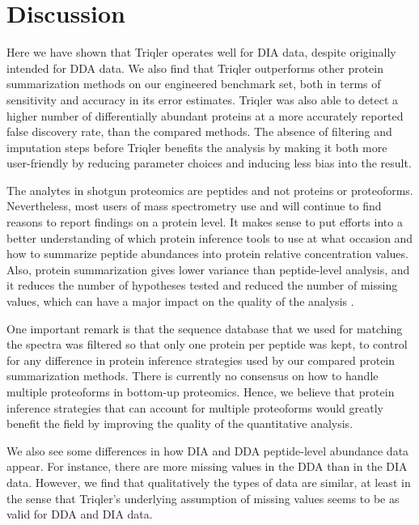 \documentclass[10pt,letterpaper]{article}
\begin{document}
\section*{Discussion}

Here we have shown that Triqler operates well for DIA data, despite originally intended for DDA data. We also find that Triqler outperforms other protein summarization methods on our engineered benchmark set, both in terms of sensitivity and accuracy in its error estimates. Triqler was also able to detect a higher number of differentially abundant proteins at a more accurately reported false discovery rate, than the compared methods. The absence of filtering and imputation steps before Triqler benefits the analysis by making it both more user-friendly by reducing parameter choices and inducing less bias into the result. 

The analytes in shotgun proteomics are peptides and not proteins or proteoforms. Nevertheless, most users of mass spectrometry use and will continue to find reasons to report findings on a protein level. It makes sense to put efforts into a better understanding of which protein inference tools to use at what occasion and how to summarize peptide abundances into protein relative concentration values.  Also, protein summarization gives lower variance than peptide-level analysis, and it reduces the number of hypotheses tested and reduced the number of missing values, which can have a major impact on the quality of the analysis \cite{plubell2021can}.   

One important remark is that the sequence database that we used for matching the spectra was filtered so that only one protein per peptide was kept, to control for any difference in protein inference strategies used by our compared protein summarization methods. There is currently no consensus on how to handle multiple proteoforms in bottom-up proteomics. Hence, we believe that protein inference strategies that can account for multiple proteoforms would greatly benefit the field by improving the quality of the quantitative analysis. 

We also see some differences in how DIA and DDA peptide-level abundance data appear. For instance, there are more missing values in the DDA than in the DIA data. However, we find that qualitatively the types of data are similar, at least in the sense that Triqler's underlying assumption of missing values seems to be as valid for DDA and DIA data.
\end{document}
